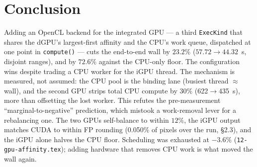 \documentclass[
	english,
	letterpaper, oneside
]{article}
\begin{document}
\section{Conclusion}

Adding an OpenCL backend for the integrated GPU --- a third \texttt{ExecKind} that
shares the dGPU's largest-first affinity and the CPU's work queue, dispatched at one
point in \texttt{compute()} --- cuts the end-to-end wall by $23.2\%$
($57.72\to44.32$~s, disjoint ranges), and by $72.6\%$ against the CPU-only floor.
The configuration wins despite trading a CPU worker for the iGPU thread. The
mechanism is measured, not assumed: the CPU pool is the binding lane (busiest
thread $\approx$ wall), and the second GPU strips total CPU compute by $30\%$
(622$\to$435~s), more than offsetting the lost worker. This refutes the
pre-measurement ``marginal-to-negative'' prediction, which mistook a
work-removal lever for a rebalancing one. The two GPUs self-balance to
within $12\%$, the iGPU output matches CUDA to within FP rounding (0.050\% of
pixels over the run, \S2.3), and the iGPU alone halves
the CPU floor. Scheduling was exhausted at $-3.6\%$
(\texttt{12-gpu-affinity.tex}); adding hardware that removes CPU work is what moved
the wall again.
\end{document}
